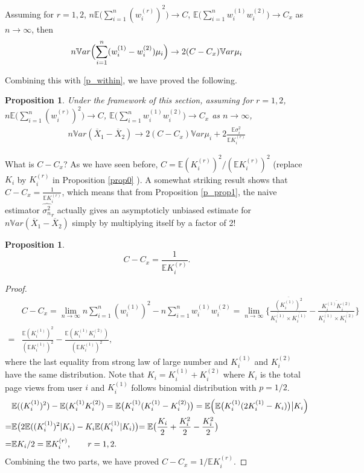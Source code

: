 \documentclass[12pt,letterpaper]{article}
\newcommand{\wht}{\widehat}
\newcommand{\var}{\ensuremath{\mathbb Var}}
\newcommand{\bbe}{\mathbb{E}}
\newcommand{\xbar}{\overline{X}}
\newcommand{\naiveest}{\wht{\sigma^2_n}}
\newtheorem{prop}[thm]{Proposition}
\begin{document}
Assuming for $r=1,2$, $n\bbe \bigl (\sum_{i=1}^n (w_i^{(r)})^2\bigr)\to C$,  $\bbe\bigl( \sum_{i=1}^n w_i^{(1)}w_i^{(2)}\bigr) \to C_{x}$ as $n\to \infty$, then 
\begin{align}\label{p_between}
n\var\Bigl( \sum_{i=1}^n (w_i^{(1)}-w_i^{(2)})\mu_i\Bigr) \to 2(C-C_x) \var \mu_i
\end{align}

Combining this with \eqref{p_within}, we have proved the following.
\begin{prop}\label{p_prop2}
Under the framework of this section, assuming for $r=1,2$, $n\bbe \bigl (\sum_{i=1}^n (w_i^{(r)})^2\bigr)\to C$,  $\bbe\bigl( \sum_{i=1}^n w_i^{(1)}w_i^{(2)}\bigr) \to C_{x}$ as $n\to \infty$, 
\begin{align}\label{p_truevar}
n\var(\xbar_1-\xbar_2) \to 2(C-C_x) \var \mu_i + 2\frac{\bbe \sigma_i^2}{\bbe K_i^{(r)}}
\end{align}
\end{prop}

What is $C-C_x$? As we have seen before, $C = \bbe (K_i^{(r)})^2 / (\bbe K_i^{(r)})^2$ (replace $K_i$ by $K_i^{(r)}$ in Proposition \ref{prop0} ). A somewhat striking result shows that $C- C_x = \frac{1}{\bbe K_i^{(r)}}$, which means that from Proposition \ref{p_prop1}, the naive estimator $\naiveest_r$ actually gives an asymptoticly unbiased estimate for $n\var (\xbar_1-\xbar_2)$ simply by multiplying itself by a factor of 2!

\begin{prop}\label{p_prop0}
\[C - C_x = \frac{1}{\bbe K_i^{(r)}}.\]
\end{prop}

\begin{proof}
\begin{align*}
&C - C_x = \lim_{n\to\infty} n\sum_{i=1}^n (w_i^{(1)})^2 - n\sum_{i=1}^n w_i^{(1)}w_i^{(2)} = \lim_{n\to\infty}\Biggl\{ \frac{\overline{(K_i^{(1)})^2}}{\overline{K_i^{(1)}}\times \overline{K_i^{(1)}}} - \frac{\overline{K_i^{(1)}K_i^{(2)}}}{\overline{K_i^{(1)}}\times \overline{K_i^{(2)}}} \Biggr \}\\
=& \frac{\bbe (K_i^{(1)})^2}{(\bbe K_i^{(1)})^2} - \frac{\bbe (K_i^{(1)}K_i^{(2)})}{(\bbe K_i^{(1)})^2},
\end{align*}
where the last equality from strong law of large number and $K_i^{(1)}$ and $K_i^{(2)}$ have the same distribution. Note that $K_i = K_i^{(1)}+K_i^{(2)}$ where $K_i$ is the total page views from user $i$ and $K_i^{(1)}$ follows binomial distribution with $p=1/2$.
\begin{align*}
&\bbe((K_i^{(1)})^2) - \bbe (K_i^{(1)}K_i^{(2)}) = \bbe\bigl( K_i^{(1)}(K_i^{(1)}-K_i^{(2)})\bigr) = \bbe \Bigl(\bbe\bigl( K_i^{(1)}(2K_i^{(1)}-K_i)\bigr)\big| K_i \Bigr) \\
=& \bbe \bigl( 2\bbe((K_i^{(1)})^2|K_i) - K_i \bbe(K_i^{(1)}|K_i)  \bigl) = \bbe \bigl( \frac{K_i}{2}+\frac{K_i^2}{2} - \frac{K_i^2}{2} \bigr) \\
=&  \bbe{K_i}/2 = \bbe K_i^{(r)},  \qquad r=1,2.
\end{align*}
Combining the two parts, we have proved $C - C_x = 1/ \bbe K_i^{(r)}$.
\end{proof}
\end{document}
